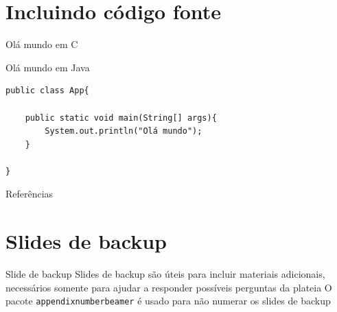 \documentclass[aspectratio=169]{beamer}
\begin{document}
\section{Incluindo código fonte}


\begin{frame}[fragile]{Olá mundo em C}
    
\end{frame}

\begin{frame}[fragile]{Olá mundo em Java}
\begin{lstlisting}[style=java]
public class App{

    public static void main(String[] args){
        System.out.println("Olá mundo");
    }

}
\end{lstlisting}
\end{frame}

    
\begin{frame}{Referências}
    \nocite{*}
    
    
\end{frame}

\appendix

\section{Slides de backup}

\begin{frame}{Slide de backup}
    Slides de backup são úteis para incluir materiais adicionais, necessários somente para ajudar a responder possíveis perguntas da plateia
    \vfill
    O pacote \texttt{appendixnumberbeamer} é usado para não numerar os slides de backup
\end{frame}
\end{document}
